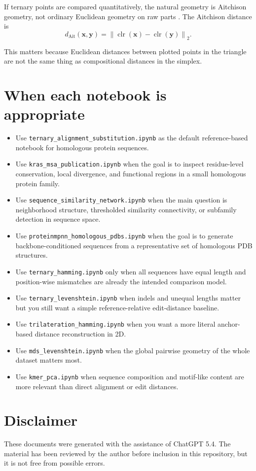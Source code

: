 \documentclass[11pt,a4paper]{article}
\begin{document}
If ternary points are compared quantitatively, the natural geometry is Aitchison geometry, not ordinary Euclidean geometry on raw parts \cite{Aitchison1986,PawlowskyGlahn2011}. The Aitchison distance is
\[
d_{\mathrm{Ait}}(\bm{x},\bm{y})
=\left\|\operatorname{clr}(\bm{x})-\operatorname{clr}(\bm{y})\right\|_2.
\]

This matters because Euclidean distances between plotted points in the triangle are not the same thing as compositional distances in the simplex.

\section{When each notebook is appropriate}

\begin{itemize}[leftmargin=*]
\item Use \texttt{ternary\_alignment\_substitution.ipynb} as the default reference-based notebook for homologous protein sequences.
\item Use \texttt{kras\_msa\_publication.ipynb} when the goal is to inspect residue-level conservation, local divergence, and functional regions in a small homologous protein family.
\item Use \texttt{sequence\_similarity\_network.ipynb} when the main question is neighborhood structure, thresholded similarity connectivity, or subfamily detection in sequence space.
\item Use \texttt{proteinmpnn\_homologous\_pdbs.ipynb} when the goal is to generate backbone-conditioned sequences from a representative set of homologous PDB structures.
\item Use \texttt{ternary\_hamming.ipynb} only when all sequences have equal length and position-wise mismatches are already the intended comparison model.
\item Use \texttt{ternary\_levenshtein.ipynb} when indels and unequal lengths matter but you still want a simple reference-relative edit-distance baseline.
\item Use \texttt{trilateration\_hamming.ipynb} when you want a more literal anchor-based distance reconstruction in 2D.
\item Use \texttt{mds\_levenshtein.ipynb} when the global pairwise geometry of the whole dataset matters most.
\item Use \texttt{kmer\_pca.ipynb} when sequence composition and motif-like content are more relevant than direct alignment or edit distances.
\end{itemize}






\section*{Disclaimer}
These documents were generated with the assistance of ChatGPT 5.4. The material has been reviewed by the author before inclusion in this repository, but it is not free from possible errors.
 
\end{document}
